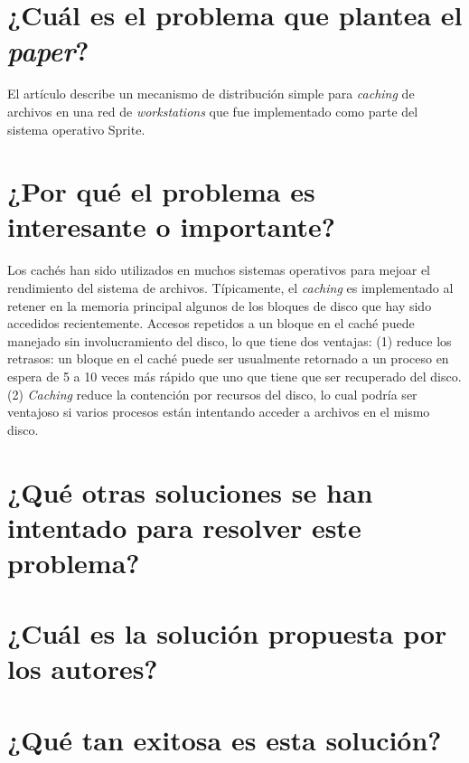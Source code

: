 
\section{¿Cuál es el problema que plantea el \textit{paper}?}
El artículo describe un mecanismo de distribución simple para \emph{caching} de archivos en una red de \emph{workstations} que fue implementado como parte del sistema operativo Sprite. 

\section{¿Por qué el problema es interesante o importante?}
Los cachés han sido utilizados en muchos sistemas operativos para mejoar el rendimiento del sistema de archivos. Típicamente, el \emph{caching} es implementado al retener en la memoria principal algunos de los bloques de disco que hay sido accedidos recientemente. Accesos repetidos a un bloque en el caché puede manejado sin involucramiento del disco, lo que tiene dos ventajas: (1) reduce los retrasos: un bloque en el caché puede ser usualmente retornado a un proceso en espera de 5 a 10 veces más rápido que uno que tiene que ser recuperado del disco. (2) \emph{Caching} reduce la contención por recursos del disco, lo cual podría ser ventajoso si varios procesos están intentando acceder a archivos en el mismo disco.

\section{¿Qué otras soluciones se han intentado para resolver este problema?}

     
\section{¿Cuál es la solución propuesta por los autores?}

\section{¿Qué tan exitosa es esta solución?} 